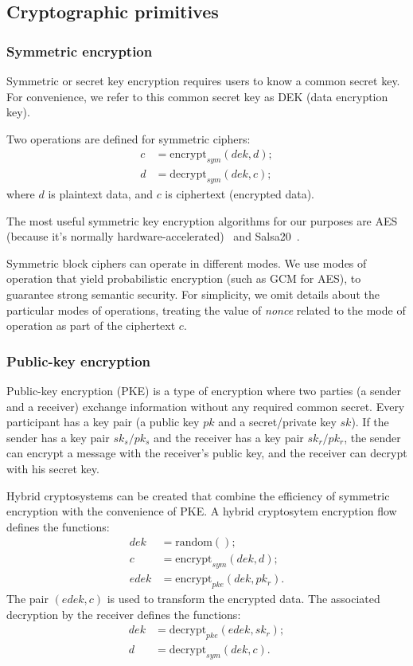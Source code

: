 \documentclass[longbibliography,nofootinbib]{revtex4-1}
\begin{document}
\subsection{Cryptographic primitives}

\subsubsection{Symmetric encryption}

Symmetric or secret key encryption requires users to know a common secret key.
For convenience, we refer to this common secret key as DEK (data encryption key).

Two operations are defined for symmetric ciphers:
\begin{align}
    c &= \text{encrypt}_{sym}(dek, d);\\
    d &= \text{decrypt}_{sym}(dek, c);
\end{align}
where $d$ is plaintext data, and $c$ is ciphertext (encrypted data).

The most useful symmetric key encryption algorithms for our purposes are AES (because it's normally hardware-accelerated)~\cite{wiki:aes}
and Salsa20~\cite{wiki:salsa20}.

Symmetric block ciphers can operate in different modes.
We use modes of operation that yield probabilistic encryption (such as GCM for AES), to guarantee strong semantic security.
For simplicity, we omit details about the particular modes of operations, treating the value of \emph{nonce} related to the mode of operation as part of the
ciphertext $c$.

\subsubsection{Public-key encryption}

Public-key encryption (PKE) is a type of encryption where two parties (a sender and a receiver) exchange information without any required common secret.
Every participant has a key pair (a public key $pk$ and a secret/private key $sk$).
If the sender has a key pair $sk_s/pk_s$ and the receiver has a key pair $sk_r/pk_r$, the sender can encrypt a message with the receiver's public key,
and the receiver can decrypt with his secret key.

Hybrid cryptosystems can be created that combine the efficiency of symmetric encryption with the convenience of PKE.
A hybrid cryptosytem encryption flow defines the functions:
\begin{align}
    dek &= \text{random}();\\
    c &= \text{encrypt}_{sym}(dek, d);\\
    edek &= \text{encrypt}_{pke}(dek, pk_r).
\end{align}
The pair $(edek, c)$ is used to transform the encrypted data.
The associated decryption by the receiver defines the functions:
\begin{align}
    dek &= \text{decrypt}_{pke}(edek, sk_r);\\
    d &= \text{decrypt}_{sym}(dek, c).
\end{align}
\end{document}
